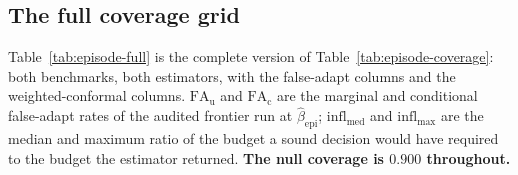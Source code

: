 \subsection{The full coverage grid}

Table~\ref{tab:episode-full} is the complete version of Table~\ref{tab:episode-coverage}: both
benchmarks, both estimators, with the false-adapt columns and the weighted-conformal columns.
$\mathrm{FA}_{\mathrm u}$ and $\mathrm{FA}_{\mathrm c}$ are the marginal and conditional false-adapt
rates of the audited frontier run at $\widehat\beta_{\mathrm{epi}}$;
$\mathrm{infl}_{\mathrm{med}}$ and $\mathrm{infl}_{\mathrm{max}}$ are the median and maximum ratio
of the budget a sound decision would have required to the budget the estimator returned.
\textbf{The null coverage is $0.900$ throughout.}

